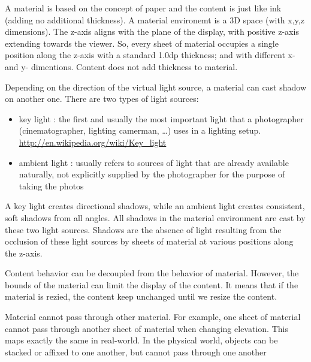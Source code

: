 A material is based on the concept of paper and the content is just like ink
(adding no additional thickness). A material environemt is a 3D space (with
x,y,z dimensions). The z-axis aligns with the plane of the display, with
positive z-axis extending towards the viewer. So, every sheet of material
occupies a single position along the z-axis with a standard 1.0dp thickness; and
with different x- and y- dimentions. Content does not add thickness to material.

Depending on the direction of the virtual light source, a material can cast
shadow on another one. There are two types of light sources:
\begin{itemize}
  \item key light : the first and usually the most important light that a
  photographer (cinematographer, lighting camerman, \ldots) uses in a lighting
  setup.
  \url{http://en.wikipedia.org/wiki/Key_light}
  
  \item ambient light : usually refers to sources of light that are already
  available naturally, not explicitly supplied by the photographer for the
  purpose of taking the photos
\end{itemize}
A key light creates directional shadows, while an ambient light creates
consistent, soft shadows from all angles.
All shadows in the material environment are cast by these two light sources.
Shadows are the absence of light resulting from the occlusion of these light
sources by sheets of material at various positions along the z-axis.

Content behavior can be decoupled from the behavior of material. However, the
bounds of the material can limit the display of the content. It means that if
the material is rezied, the content keep unchanged until we resize the content. 


Material cannot pass through other material. For example, one sheet of material
cannot pass through another sheet of material when changing elevation. This maps
exactly the same in real-world. In the physical world, objects can be stacked or
affixed to one another, but cannot pass through one another

